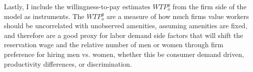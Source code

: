 \documentclass[12pt]{article}
\begin{document}








Lastly, I include the willingness-to-pay estimates $WTP^g_o$ from the firm side of the model as instruments. The $WTP^g_o$ are a measure of how much firms value workers should be uncorrelated with unobserved amenities, assuming amenities are fixed, and therefore are a good proxy for labor demand side factors that will shift the reservation wage and the relative number of men or women through firm preference for hiring men vs. women, whether this be consumer demand driven, productivity differences, or discrimination.
\end{document}

